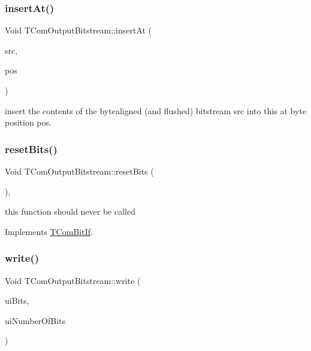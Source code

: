 \mbox{\label{class_t_com_output_bitstream_a2a2fc7f96529112e47950a7404a4713e}} 
\subsubsection{\texorpdfstring{insert\+At()}{insertAt()}}
{\footnotesize\ttfamily Void T\+Com\+Output\+Bitstream\+::insert\+At (\begin{DoxyParamCaption}\item[{const \hyperlink{class_t_com_output_bitstream}{T\+Com\+Output\+Bitstream} \&}]{src,  }\item[{U\+Int}]{pos }\end{DoxyParamCaption})}

insert the contents of the bytealigned (and flushed) bitstream src into this at byte position pos. \mbox{\label{class_t_com_output_bitstream_ae7470ca7d0deab9c5f7c327e17f0bce0}} 
\subsubsection{\texorpdfstring{reset\+Bits()}{resetBits()}}
{\footnotesize\ttfamily Void T\+Com\+Output\+Bitstream\+::reset\+Bits (\begin{DoxyParamCaption}{ }\end{DoxyParamCaption})\hspace{0.3cm}{\ttfamily [inline]}, {\ttfamily [virtual]}}

this function should never be called 

Implements \hyperlink{class_t_com_bit_if}{T\+Com\+Bit\+If}.

\mbox{\label{class_t_com_output_bitstream_a804f4dcb6c5182a8d360d68ac849a85a}} 
\subsubsection{\texorpdfstring{write()}{write()}}
{\footnotesize\ttfamily Void T\+Com\+Output\+Bitstream\+::write (\begin{DoxyParamCaption}\item[{U\+Int}]{ui\+Bits,  }\item[{U\+Int}]{ui\+Number\+Of\+Bits }\end{DoxyParamCaption})\hspace{0.3cm}{\ttfamily [virtual]}}

